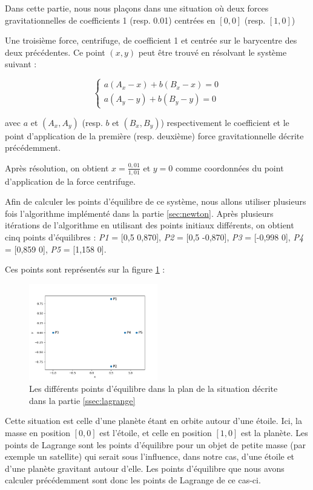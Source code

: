 Dans cette partie, nous nous plaçons dans une situation où deux forces gravitationnelles de coefficients 1 (resp. 0.01) centrées en $[0, 0]$ (resp. $[1, 0]$)

Une troisième force, centrifuge, de coefficient 1 et centrée sur le barycentre des deux précédentes. Ce point $(x, y)$ peut être trouvé en résolvant le système suivant :

$$
\begin{cases}
  a(A_x - x) + b(B_x - x) = 0 \\
  a(A_y - y) + b(B_y - y) = 0
\end{cases}
$$

avec $a$ et $(A_x, A_y)$ (resp. $b$ et $(B_x, B_y)$) respectivement le coefficient et le point d'application de la première (resp. deuxième) force gravitationnelle décrite précédemment.

Après résolution, on obtient $x = \frac{0,01}{1,01}$ et $y = 0$ comme coordonnées du point d'application de la force centrifuge.

\bigskip

Afin de calculer les points d'équilibre de ce système, nous allons utiliser plusieurs fois l'algorithme implémenté dans la partie \ref{sec:newton}. Après plusieurs itérations de l'algorithme en utilisant des points initiaux différents, on obtient cinq points d'équilibres : \emph{P1} = [0,5  0,870], \emph{P2} = [0,5  -0,870], \emph{P3} = [-0,998  0], \emph{P4} = [0,859  0], \emph{P5} = [1,158  0].

Ces points sont représentés sur la figure \ref{fig:equi_pts} :

\begin{figure}[ht]
  \centering
  \includegraphics[width=0.5\textwidth]{img/equilibrium_points.png}
  \caption{Les différents points d'équilibre dans la plan de la situation décrite dans la partie \ref{ssec:lagrange}}
  \label{fig:equi_pts}
\end{figure}

\bigskip

Cette situation est celle d'une planète étant en orbite autour d'une étoile. Ici, la masse en position $[0, 0]$ est l'étoile, et celle en position $[1, 0]$ est la planète. Les points de Lagrange sont les points d'équilibre pour un objet de petite masse (par exemple un satellite) qui serait sous l'influence, dans notre cas, d'une étoile et d'une planète gravitant autour d'elle. Les points d'équilibre que nous avons calculer précédemment sont donc les points de Lagrange de ce cas-ci.

